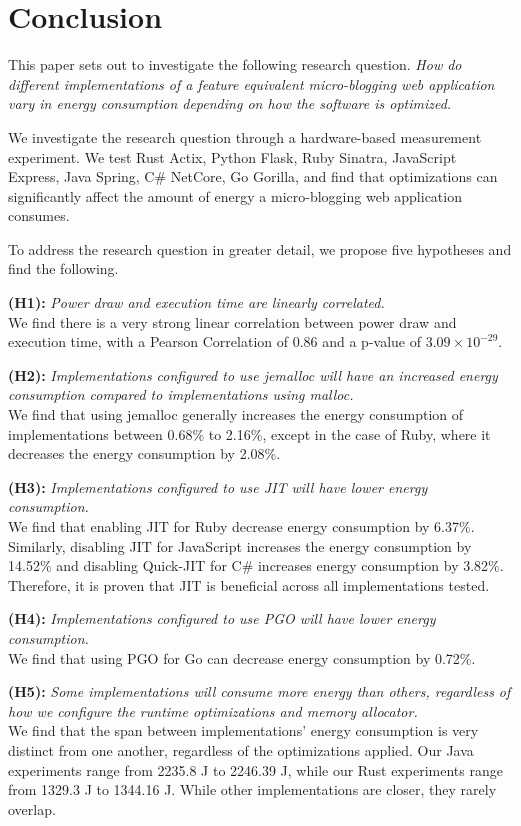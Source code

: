 \documentclass[main.tex]{subfiles}
\begin{document}
\section{Conclusion}

This paper sets out to investigate the following research question. \emph{How do different implementations of a feature equivalent micro-blogging web application vary in energy consumption depending on how the software is optimized.}

We investigate the research question through a hardware-based measurement experiment. We test Rust Actix, Python Flask, Ruby Sinatra, JavaScript Express, Java Spring, C\# NetCore, Go Gorilla, and find that optimizations can significantly affect the amount of energy a micro-blogging web application consumes.

To address the research question in greater detail, we propose five hypotheses and find the following.

\textbf{(H1):} \emph{Power draw and execution time are linearly correlated.}
\\
We find there is a very strong linear correlation between power draw and execution time, with a Pearson Correlation of 0.86 and a p-value of $3.09 \times 10^{-29}$.

\textbf{(H2):} \emph{Implementations configured to use jemalloc will have an increased energy consumption compared to implementations using malloc.}
\\
We find that using jemalloc generally increases the energy consumption of implementations between 0.68\% to 2.16\%, except in the case of Ruby, where it decreases the energy consumption by 2.08\%.

\textbf{(H3):} \emph{Implementations configured to use JIT will have lower energy consumption.}
\\
We find that enabling JIT for Ruby decrease energy consumption by 6.37\%. Similarly, disabling JIT for JavaScript increases the energy consumption by 14.52\% and disabling Quick-JIT for C\# increases energy consumption by 3.82\%. Therefore, it is proven that JIT is beneficial across all implementations tested. 

\textbf{(H4):} \emph{Implementations configured to use PGO will have lower energy consumption.}
\\
We find that using PGO for Go can decrease energy consumption by 0.72\%.

\textbf{(H5):} \emph{Some implementations will consume more energy than others, regardless of how we configure the runtime optimizations and memory allocator.}
\\
We find that the span between implementations' energy consumption is very distinct from one another, regardless of the optimizations applied. Our Java experiments range from 2235.8 J to 2246.39 J, while our Rust experiments range from 1329.3 J to 1344.16 J. While other implementations are closer, they rarely overlap.
\end{document}
